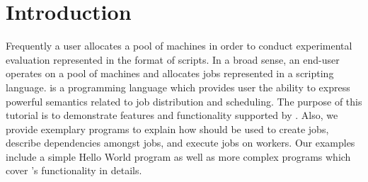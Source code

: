 \section{Introduction}
\label{sect:intro}

Frequently a user allocates a pool of machines in order to conduct experimental
evaluation represented in the format of scripts. In a broad sense, an end-user
operates on a pool of machines and allocates jobs represented in a scripting
language. \lang{} is a programming language which provides user the ability
to express powerful semantics related to job distribution and scheduling.
The purpose of this tutorial is to demonstrate features and functionality 
supported by \lang{}. Also, we provide exemplary programs  to
explain how \lang{}  should be used to create jobs, describe dependencies amongst jobs,
and execute jobs on workers. Our examples include a simple Hello World program as well as
more complex programs which cover \lang{}'s functionality in details.
